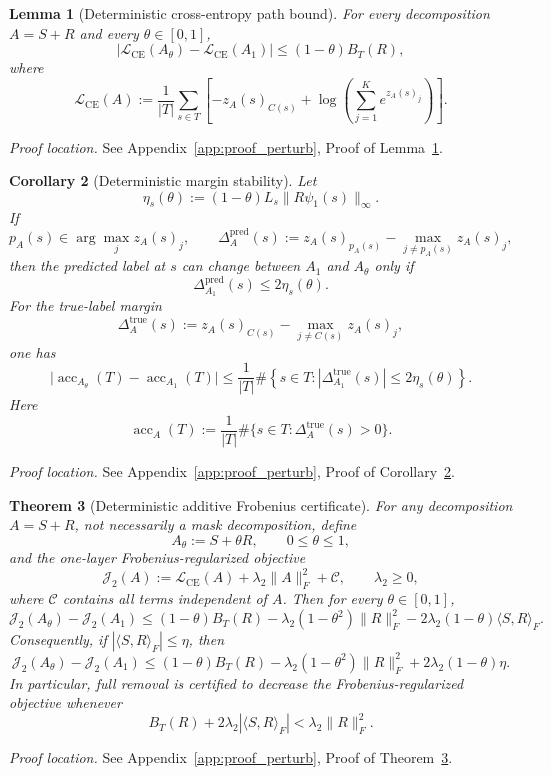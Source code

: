 \documentclass[11pt]{article}
\theoremstyle{plain}
\newtheorem{thm}{Theorem}[section]
\newtheorem{cor}[thm]{Corollary}
\newtheorem{lem}[thm]{Lemma}
\theoremstyle{definition}
\theoremstyle{remark}
\newcommand{\acc}{\operatorname{acc}}
\newcommand{\1}{\mathbf{1}}
\newcommand{\proofloc}[1]{\par\noindent\emph{Proof location.} #1\par}
\begin{document}
\begin{lem}[Deterministic cross-entropy path bound]
\label{lem:deterministic_ce_path_bound}
For every decomposition \(A=S+R\) and every \(\theta\in[0,1]\),
\[
\left|
\mathcal L_{\mathrm{CE}}(A_\theta)-\mathcal L_{\mathrm{CE}}(A_1)
\right|
\le
(1-\theta)B_T(R),
\]
where
\[
\mathcal L_{\mathrm{CE}}(A)
:=
\frac1{|T|}\sum_{s\in T}
\left[
-z_A(s)_{C(s)}
+\log\!\left(\sum_{j=1}^K e^{z_A(s)_j}\right)
\right].
\]
\end{lem}
\proofloc{See Appendix~\ref{app:proof_perturb}, Proof of Lemma~\ref{lem:deterministic_ce_path_bound}.}

\begin{cor}[Deterministic margin stability]
\label{cor:deterministic_margin_stability}
Let
\[
\eta_s(\theta):=(1-\theta)L_s\|R\psi_1(s)\|_\infty.
\]
If
\[
p_A(s)\in\arg\max_j z_A(s)_j,
\qquad
\Delta_A^{\mathrm{pred}}(s):=
z_A(s)_{p_A(s)}-\max_{j\ne p_A(s)}z_A(s)_j,
\]
then the predicted label at \(s\) can change between \(A_1\) and \(A_\theta\) only if
\[
\Delta_{A_1}^{\mathrm{pred}}(s)\le 2\eta_s(\theta).
\]
For the true-label margin
\[
\Delta_A^{\mathrm{true}}(s):=
z_A(s)_{C(s)}-\max_{j\ne C(s)}z_A(s)_j,
\]
one has
\[
\big|\acc_{A_\theta}(T)-\acc_{A_1}(T)\big|
\le
\frac1{|T|}
\#\left\{s\in T:
\left|\Delta_{A_1}^{\mathrm{true}}(s)\right|
\le 2\eta_s(\theta)
\right\}.
\]
Here
\[
\acc_A(T):=\frac1{|T|}\#\{s\in T:\Delta_A^{\mathrm{true}}(s)>0\}.
\]
\end{cor}
\proofloc{See Appendix~\ref{app:proof_perturb}, Proof of Corollary~\ref{cor:deterministic_margin_stability}.}

\begin{thm}[Deterministic additive Frobenius certificate]
\label{thm:deterministic_additive_frobenius_certificate}
For any decomposition \(A=S+R\), not necessarily a mask decomposition, define
\[
A_\theta:=S+\theta R,\qquad 0\le\theta\le1,
\]
and the one-layer Frobenius-regularized objective
\[
\mathcal J_2(A):=
\mathcal L_{\mathrm{CE}}(A)+\lambda_2\|A\|_F^2+\mathcal C,
\qquad \lambda_2\ge0,
\]
where \(\mathcal C\) contains all terms independent of \(A\). Then for every \(\theta\in[0,1]\),
\[
\mathcal J_2(A_\theta)-\mathcal J_2(A_1)
\le
(1-\theta)B_T(R)
-
\lambda_2(1-\theta^2)\|R\|_F^2
-
2\lambda_2(1-\theta)\langle S,R\rangle_F.
\]
Consequently, if \(|\langle S,R\rangle_F|\le\eta\), then
\[
\mathcal J_2(A_\theta)-\mathcal J_2(A_1)
\le
(1-\theta)B_T(R)
-
\lambda_2(1-\theta^2)\|R\|_F^2
+
2\lambda_2(1-\theta)\eta.
\]
In particular, full removal is certified to decrease the Frobenius-regularized objective whenever
\[
B_T(R)+2\lambda_2|\langle S,R\rangle_F|
<
\lambda_2\|R\|_F^2.
\]
\end{thm}
\proofloc{See Appendix~\ref{app:proof_perturb}, Proof of Theorem~\ref{thm:deterministic_additive_frobenius_certificate}.}
\end{document}
